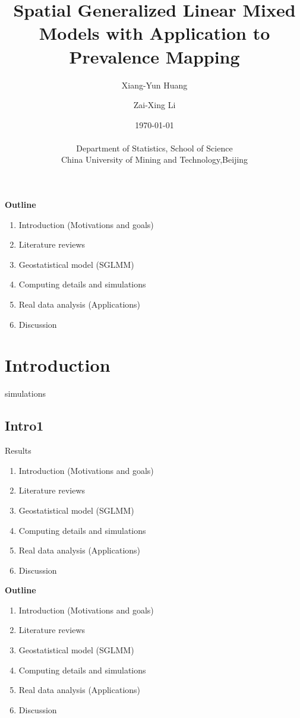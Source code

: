\documentclass[12pt,compress,xcolor=x11names,UTF8]{beamer}
\title{Spatial Generalized Linear Mixed Models with Application to Prevalence Mapping}
\author{Xiang-Yun Huang \and Zai-Xing Li}
\date{\today \\ ~~ \\ Department of Statistics, School of Science \\ China University of Mining and Technology,Beijing}
\begin{document}
\maketitle

\begin{frame}
\textbf{Outline }
\begin{enumerate}
  \item Introduction (Motivations and goals)
  \item Literature reviews  
  \item Geostatistical model (SGLMM)
  \item Computing details and simulations
  \item Real data analysis (Applications)
  \item Discussion
\end{enumerate}
\end{frame}

\section{Introduction}

\begin{frame}{simulations }
\end{frame}

\subsection{Intro1}
\begin{frame}{Results }
\begin{enumerate}
  \item Introduction (Motivations and goals)
  \item Literature reviews  
  \item Geostatistical model (SGLMM)
  \item Computing details and simulations
  \item Real data analysis (Applications)
  \item Discussion
\end{enumerate}
\end{frame}

\begin{frame}
\textbf{Outline }
\begin{enumerate}
  \item Introduction (Motivations and goals)
  \item Literature reviews  
  \item Geostatistical model (SGLMM)
  \item Computing details and simulations
  \item Real data analysis (Applications)
  \item Discussion
\end{enumerate}
\end{frame}
\end{document}
